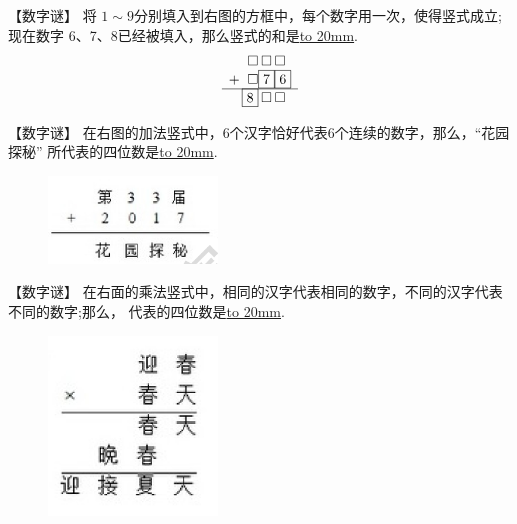 \item {
    【数字谜】
    将 $1\sim 9$分别填入到右图的方框中，每个数字用一次，使得竖式成立;现在数字 6、7、8已经被填入，那么竖式的和是\underline{\hbox to 20mm{}}.
    \[
    \begin{array}{r@{\,}r@{}c@{}l}
    & \square & \square & \square \\
    + & \square  & \boxed{7} & \boxed{6} \\
    \cline{1-4}
    & \boxed{8} & \square & \square \\
    \end{array}
    \]
    \vspace{1cm}
}

\item {
    【数字谜】
    在右图的加法竖式中，6个汉字恰好代表6个连续的数字，那么，``花园探秘'' 所代表的四位数是\underline{\hbox to 20mm{}}.
    \begin{figure}[H] 
        \centering
        \includegraphics[width=0.4\textwidth]{./pics/Chapter_7/12.png}
    \end{figure}
    \vspace{1cm}
}

\item {
    【数字谜】
    在右面的乘法竖式中，相同的汉字代表相同的数字，不同的汉字代表不同的数字;那么， 代表的四位数是\underline{\hbox to 20mm{}}.
    \begin{figure}[H] 
        \centering
        \includegraphics[width=0.4\textwidth]{./pics/Chapter_7/14.png}
    \end{figure}
    \vspace{1cm}
}